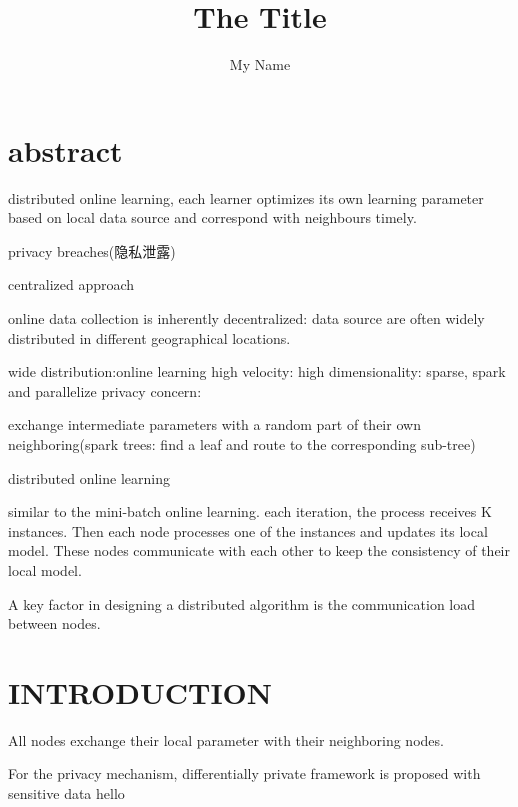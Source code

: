 \documentclass{article}
\author{My Name}
\title{The Title}
\begin{document}
	\section{abstract}
	distributed online learning,
	each learner optimizes its own learning parameter based on local data source and correspond with neighbours timely.
	
	privacy breaches(隐私泄露)
	
	centralized approach
	
	online data collection is inherently decentralized: data source are often widely distributed in different geographical locations.
	
	wide distribution:online learning
	high velocity:
	high dimensionality: sparse, spark and parallelize
	privacy concern: 
	
	exchange intermediate parameters with a random part of their own neighboring(spark trees: find a leaf and route to the corresponding sub-tree)
	
	distributed online learning
	
	similar to the mini-batch online learning. each iteration, the process receives K instances. Then each node processes one of the instances and updates its local model.
	These nodes communicate with each other to keep the consistency of their local model.
	
	A key factor in designing a distributed algorithm is the communication load between nodes.
	
	\section{INTRODUCTION}
	All nodes exchange their local parameter with their neighboring nodes.
	
	{\color{purple} For the privacy mechanism, differentially private framework is proposed with sensitive data}
	hello
	
	
	
	
	
	
	
	
\end{document}
